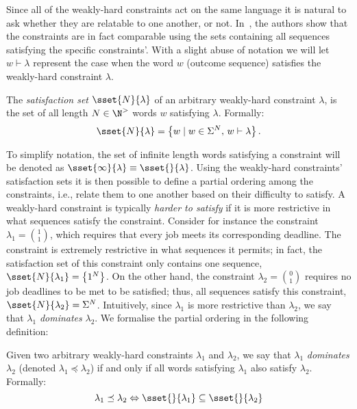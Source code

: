 Since all of the weakly-hard constraints act on the same language it is natural to ask whether they are relatable to one another, or not.
In~\cite{Bernat:2001}, the authors show that the constraints are in fact comparable using the sets containing all sequences satisfying the specific constraints'.
With a slight abuse of notation we will let $w \vdash \lambda$ represent the case when the word $w$ (outcome sequence) satisfies the weakly-hard constraint $\lambda$.
%
\begin{definition}
    The \emph{satisfaction set} $\sset{N}{\lambda}$ of an arbitrary weakly-hard constraint $\lambda$, is the set of all length $N \in \N^{>}$ words $w$ satisfying $\lambda$.
    Formally:
    \begin{equation}
        \sset{N}{\lambda} = \left\{ w \mid w \in \Sigma^N,\, w \vdash \lambda \right\}.
    \end{equation}
\end{definition}
%
To simplify notation, the set of infinite length words satisfying a constraint will be denoted as $\sset{\infty}{\lambda} \equiv \sset{}{\lambda}$.
Using the weakly-hard constraints' satisfaction sets it is then possible to define a partial ordering among the constraints, i.e., relate them to one another based on their difficulty to satisfy.
A weakly-hard constraint is typically \emph{harder to satisfy} if it is more restrictive in what sequences satisfy the constraint.
Consider for instance the constraint $\lambda_1 = \binom{1}{1}$, which requires that every job meets its corresponding deadline.
The constraint is extremely restrictive in what sequences it permits; in fact, the satisfaction set of this constraint only contains one sequence, $\sset{N}{\lambda_1} = \left\{ 1^N \right\}$.
On the other hand, the constraint $\lambda_2 = \binom{0}{1}$ requires no job deadlines to be met to be satisfied; thus, all sequences satisfy this constraint, $\sset{N}{\lambda_2} = \Sigma^N$.
Intuitively, since $\lambda_1$ is more restrictive than $\lambda_2$, we say that $\lambda_1$ \emph{dominates} $\lambda_2$.
We formalise the partial ordering in the following definition:
%
\begin{definition}%
    \label{def:kappa:dominance}%
    Given two arbitrary weakly-hard constraints $\lambda_1$ and $\lambda_2$, we say that $\lambda_1$ \emph{dominates} $\lambda_2$ (denoted $\lambda_1 \preceq \lambda_2$) if and only if all words satisfying $\lambda_1$ also satisfy $\lambda_2$.
    Formally:
    \begin{equation}
        \lambda_1 \preceq \lambda_2 \Leftrightarrow \sset{}{\lambda_1} \subseteq \sset{}{\lambda_2}
    \end{equation}
\end{definition}
